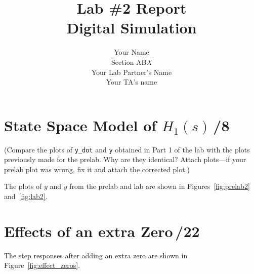 \documentclass{article}
\newcommand{\score}{\hfill \underline{\hspace{0.65cm}}\,/} %
\begin{document}
%
\title{\bf Lab \#2 Report\\{\sc Digital Simulation}}
\author{Your Name\\ Section AB\emph{X}\\
  Your Lab Partner's Name\\
  Your TA's name}
\maketitle
\noindent {}
\section{{\sc State Space Model of} $H_1(s)$\score 8}
(Compare the plots of \verb|y_dot| and \verb|y| obtained in Part 1 of the lab with the plots previously made for the prelab. Why are they identical? Attach plots---if your prelab plot was wrong, fix it and attach the corrected plot.)

\noindent The plots of $y$ and $\dot{y}$ from the prelab and lab are shown in Figures~\ref{fig:prelab2} and~\ref{fig:lab2}.



\section{{\sc Effects of an extra Zero}\score 22}
The step responses after adding an extra zero are shown in Figure~\ref{fig:effect_zeros}.
\end{document}

